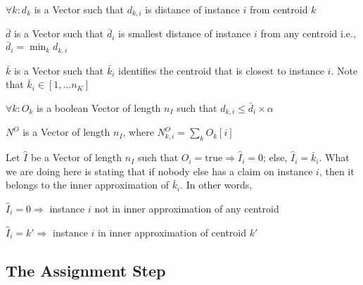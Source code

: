 \be
\item \(\forall k: d_k \) is a Vector such that \(d_{k, i}\)
is distance of instance \(i\) from centroid \(k\)
\item \(\bar{d}\) is a Vector such that \(\bar{d}_i\) is
smallest distance of instance \(i\) from any centroid i.e.,
\(\bar{d}_i = \min_k d_{k, i}\)
\item \(\bar{k}\) is a Vector such that \(\bar{k}_i\) identifies
the centroid that is closest to instance \(i\). Note that 
\(\bar{k}_i \in [1, \ldots n_K]\)
\item \(\forall k: O_k\) is a boolean Vector of length \(n_I\) such that 
\(d_{k, i} \leq \bar{d}_i \times \alpha\)
\item \(N^O\) is a Vector of length \(n_I\), 
where \(N^O_{k, i}  = \sum_k O_k[i]\)
\item Let \(\hat{I}\) be a Vector of length \(n_I\) such that 
\(O_i = \mathrm{true} \Rightarrow \hat{I}_i = 0\); else, \(\hat{I}_i = \bar{k}_i\). What
we are doing here is stating that if nobody else has a claim on instance \(i\), then
it belongs to the inner approximation of \(\bar{k}_i\). In other words,
\be
\item \(\hat{I}_i = 0 \Rightarrow \) instance \(i\) not in inner approximation
of any centroid
\item \(\hat{I}_i = k' \Rightarrow \) instance \(i\) in inner approximation
of centroid \(k'\)
\ee
\ee

\subsection{The Assignment Step}
\label{assignment}




